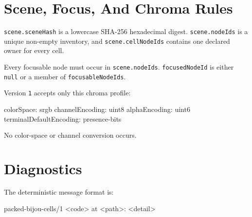 \section{Scene, Focus, And Chroma Rules}\label{record-022-scene-focus-and-chroma-rules}

\texttt{s\allowbreak{}c\allowbreak{}e\allowbreak{}n\allowbreak{}e\allowbreak{}.\allowbreak{}s\allowbreak{}c\allowbreak{}e\allowbreak{}n\allowbreak{}e\allowbreak{}H\allowbreak{}a\allowbreak{}s\allowbreak{}h} is a lowercase SHA-256 hexadecimal digest. \texttt{s\allowbreak{}c\allowbreak{}e\allowbreak{}n\allowbreak{}e\allowbreak{}.\allowbreak{}n\allowbreak{}o\allowbreak{}d\allowbreak{}e\allowbreak{}I\allowbreak{}d\allowbreak{}s} is a unique non-empty inventory, and \texttt{s\allowbreak{}c\allowbreak{}e\allowbreak{}n\allowbreak{}e\allowbreak{}.\allowbreak{}c\allowbreak{}e\allowbreak{}l\allowbreak{}l\allowbreak{}N\allowbreak{}o\allowbreak{}d\allowbreak{}e\allowbreak{}I\allowbreak{}d\allowbreak{}s} contains one declared owner for every cell.

Every focusable node must occur in \texttt{s\allowbreak{}c\allowbreak{}e\allowbreak{}n\allowbreak{}e\allowbreak{}.\allowbreak{}n\allowbreak{}o\allowbreak{}d\allowbreak{}e\allowbreak{}I\allowbreak{}d\allowbreak{}s}. \texttt{f\allowbreak{}o\allowbreak{}c\allowbreak{}u\allowbreak{}s\allowbreak{}e\allowbreak{}d\allowbreak{}N\allowbreak{}o\allowbreak{}d\allowbreak{}e\allowbreak{}I\allowbreak{}d} is either \texttt{n\allowbreak{}u\allowbreak{}l\allowbreak{}l} or a member of \texttt{f\allowbreak{}o\allowbreak{}c\allowbreak{}u\allowbreak{}s\allowbreak{}a\allowbreak{}b\allowbreak{}l\allowbreak{}e\allowbreak{}N\allowbreak{}o\allowbreak{}d\allowbreak{}e\allowbreak{}I\allowbreak{}d\allowbreak{}s}.

Version \texttt{1} accepts only this chroma profile:

\begin{CodeBlock}
colorSpace: srgb
channelEncoding: uint8
alphaEncoding: uint6
terminalDefaultEncoding: presence-bits
\end{CodeBlock}

No color-space or channel conversion occurs.

\section{Diagnostics}\label{record-022-diagnostics}

The deterministic message format is:

\begin{CodeBlock}
packed-bijou-cells/1 <code> at <path>: <detail>
\end{CodeBlock}

